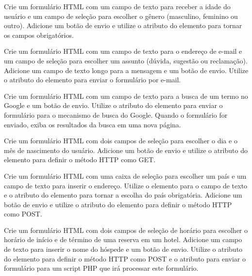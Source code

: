 \begin{exercise}
Crie um formulário HTML com um campo de texto para receber a idade do usuário e um campo de seleção para escolher o gênero (masculino, feminino ou outro). Adicione um botão de envio e utilize o atributo  do elemento  para tornar os campos obrigatórios.
\end{exercise}

\begin{exercise}
Crie um formulário HTML com um campo de texto para o endereço de e-mail e um campo de seleção para escolher um assunto (dúvida, sugestão ou reclamação). Adicione um campo de texto longo para a mensagem e um botão de envio. Utilize o atributo  do elemento  para enviar o formulário por e-mail.
\end{exercise}

\begin{exercise}
Crie um formulário HTML com um campo de texto para a busca de um termo no Google e um botão de envio. Utilize o atributo  do elemento  para enviar o formulário para o mecanismo de busca do Google. Quando o formulário for enviado, exiba os resultados da busca em uma nova página.
\end{exercise}

\begin{exercise}
Crie um formulário HTML com dois campos de seleção para escolher o dia e o mês de nascimento do usuário. Adicione um botão de envio e utilize o atributo  do elemento  para definir o método HTTP como GET.
\end{exercise}

\begin{exercise}
Crie um formulário HTML com uma caixa de seleção para escolher um país e um campo de texto para inserir o endereço. Utilize o elemento  para o campo de texto e o atributo  do elemento  para tornar a escolha do país obrigatória. Adicione um botão de envio e utilize o atributo  do elemento  para definir o método HTTP como POST.
\end{exercise}

\begin{exercise}
Crie um formulário HTML com dois campos de seleção de horário para escolher o horário de início e de término de uma reserva em um hotel. Adicione um campo de texto para inserir o nome do hóspede e um botão de envio. Utilize o atributo  do elemento  para definir o método HTTP como POST e o atributo  para enviar o formulário para um script PHP que irá processar este formulário.
\end{exercise}

